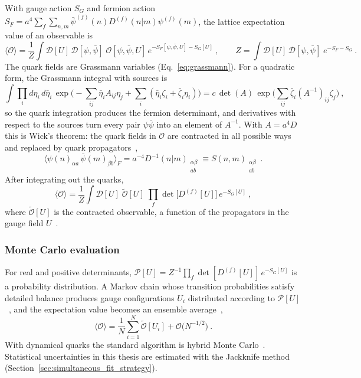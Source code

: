 With gauge action $S_G$ and fermion action $S_F=a^4\sum_f\sum_{n,m}\bar\psi^{(f)}(n)D^{(f)}(n|m)\psi^{(f)}(m)$, the lattice expectation value of an observable is~\cite{Gattringer:2010zz,Lin:2014}
\begin{equation}
    \langle\mathcal O\rangle=\frac{1}{Z}\int\mathcal D[U]\,\mathcal D[\psi,\bar\psi]\;\mathcal O[\psi,\bar\psi,U]\,e^{-S_F[\psi,\bar\psi,U]-S_G[U]} \ , \qquad
    Z=\int\mathcal D[U]\,\mathcal D[\psi,\bar\psi]\;e^{-S_F-S_G} \ .
    \label{eq:lattice_pi}
\end{equation}
The quark fields are Grassmann variables (Eq.~\eqref{eq:grassmann}). For a quadratic form, the Grassmann integral with sources is~\cite{Lin:2014}
\begin{equation}
    \int\prod_i d\eta_i\,d\bar\eta_i\,\exp\Big(-\sum_{ij}\bar\eta_iA_{ij}\eta_j+\sum_i(\bar\eta_i\zeta_i+\bar\zeta_i\eta_i)\Big)=c\,\det(A)\,\exp\Big(\sum_{ij}\bar\zeta_i(A^{-1})_{ij}\zeta_j\Big) \ ,
    \label{eq:grassmann_gauss}
\end{equation}
so the quark integration produces the fermion determinant, and derivatives with respect to the sources turn every pair $\psi\bar\psi$ into an element of $A^{-1}$. With $A=a^4D$ this is Wick's theorem: the quark fields in $\mathcal O$ are contracted in all possible ways and replaced by quark propagators~\cite{Gattringer:2010zz},
\begin{equation}
    \big\langle\psi(n)_{\alpha a}\,\bar\psi(m)_{\beta b}\big\rangle_F=a^{-4}D^{-1}(n|m)_{\substack{\alpha\beta\\ab}}\equiv S(n,m)_{\substack{\alpha\beta\\ab}} \ .
    \label{eq:quark_propagator}
\end{equation}
After integrating out the quarks,
\begin{equation}
    \langle\mathcal O\rangle=\frac{1}{Z}\int\mathcal D[U]\;\widetilde{\mathcal O}[U]\;\prod_f\det\big[D^{(f)}[U]\big]\,e^{-S_G[U]} \ ,
    \label{eq:integrated_pi}
\end{equation}
where $\widetilde{\mathcal O}[U]$ is the contracted observable, a function of the propagators in the gauge field $U$~\cite{Gattringer:2010zz}.

\subsubsection{Monte Carlo evaluation}
For real and positive determinants, $\mathcal P[U]=Z^{-1}\prod_f\det[D^{(f)}[U]]\,e^{-S_G[U]}$ is a probability distribution. A Markov chain whose transition probabilities satisfy detailed balance produces gauge configurations $U_i$ distributed according to $\mathcal P[U]$~\cite{Gattringer:2010zz}, and the expectation value becomes an ensemble average~\cite{Lin:2014},
\begin{equation}
    \langle\mathcal O\rangle=\frac{1}{N}\sum_{i=1}^{N}\widetilde{\mathcal O}[U_i]+\mathcal O\big(N^{-1/2}\big) \ .
    \label{eq:ensemble_average}
\end{equation}
With dynamical quarks the standard algorithm is hybrid Monte Carlo~\cite{Duane:1987de}. Statistical uncertainties in this thesis are estimated with the Jackknife method (Section~\ref{sec:simultaneous_fit_strategy}).

